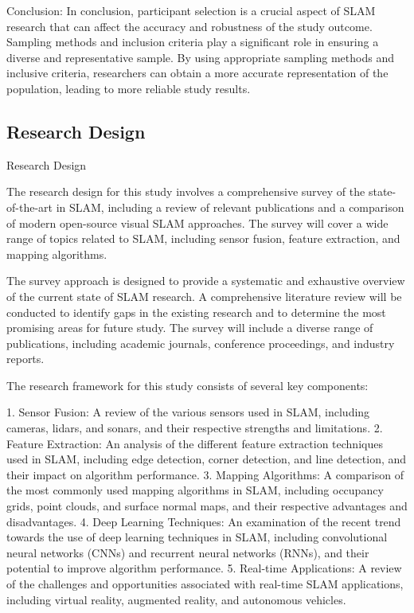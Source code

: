 \documentclass[conference]{IEEEtran}
\begin{document}
Conclusion:
In conclusion, participant selection is a crucial aspect of SLAM research that can affect the accuracy and robustness of the study outcome. Sampling methods and inclusion criteria play a significant role in ensuring a diverse and representative sample. By using appropriate sampling methods and inclusive criteria, researchers can obtain a more accurate representation of the population, leading to more reliable study results.

\subsection{Research Design}
Research Design

The research design for this study involves a comprehensive survey of the state-of-the-art in SLAM, including a review of relevant publications and a comparison of modern open-source visual SLAM approaches. The survey will cover a wide range of topics related to SLAM, including sensor fusion, feature extraction, and mapping algorithms.

The survey approach is designed to provide a systematic and exhaustive overview of the current state of SLAM research. A comprehensive literature review will be conducted to identify gaps in the existing research and to determine the most promising areas for future study. The survey will include a diverse range of publications, including academic journals, conference proceedings, and industry reports.

The research framework for this study consists of several key components:

1. Sensor Fusion: A review of the various sensors used in SLAM, including cameras, lidars, and sonars, and their respective strengths and limitations.
2. Feature Extraction: An analysis of the different feature extraction techniques used in SLAM, including edge detection, corner detection, and line detection, and their impact on algorithm performance.
3. Mapping Algorithms: A comparison of the most commonly used mapping algorithms in SLAM, including occupancy grids, point clouds, and surface normal maps, and their respective advantages and disadvantages.
4. Deep Learning Techniques: An examination of the recent trend towards the use of deep learning techniques in SLAM, including convolutional neural networks (CNNs) and recurrent neural networks (RNNs), and their potential to improve algorithm performance.
5. Real-time Applications: A review of the challenges and opportunities associated with real-time SLAM applications, including virtual reality, augmented reality, and autonomous vehicles.
\end{document}
